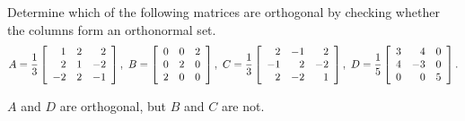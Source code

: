\documentclass{ximera}
\begin{document}
\begin{exercise}
  Determine which of the following matrices are orthogonal by checking
  whether the columns form an orthonormal set.
  \begin{equation*}
    A = \frac{1}{3}
    \startmat{rrr}
      1  &  2 &  2 \\
      2  &  1 & -2 \\
      -2 &  2 & -1 \\
    \stopmat,
    \quad
    B = \startmat{rrr}
      0 & 0 & 2 \\
      0 & 2 & 0 \\
      2 & 0 & 0 \\
    \stopmat,
    \quad
    C = \frac{1}{3}
    \startmat{rrr}
      2  & -1 &  2 \\
      -1 &  2 & -2 \\
      2  & -2 &  1 \\
    \stopmat,
    \quad
    D =
    \frac{1}{5}
    \startmat{rrr}
      3 &  4 & 0 \\
      4 & -3 & 0 \\
      0 &  0 & 5 \\
    \stopmat.
  \end{equation*}
  \begin{solution}
    $A$ and $D$ are orthogonal, but $B$ and $C$ are not.
  \end{solution}
\end{exercise}
\end{document}
